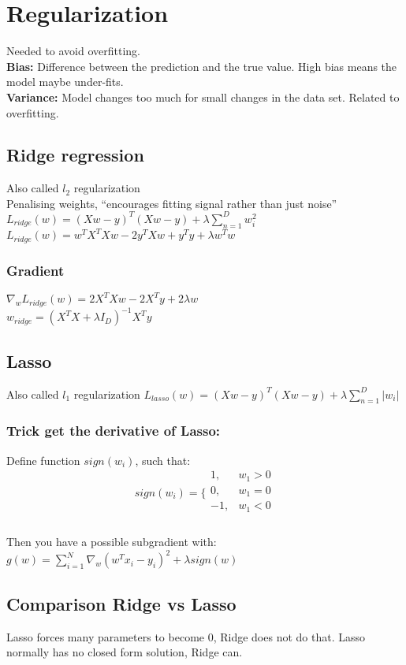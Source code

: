 \section{Regularization}
\small Needed to avoid overfitting.\\ \textbf{Bias:} Difference between the
prediction and the true value. High bias means the model maybe under-fits.\\ \textbf{Variance:}
Model changes too much for small changes in the data set. Related to overfitting.\\
\subsection{Ridge regression}
Also called $l_{2}$ regularization\\ Penalising weights, \enquote{encourages fitting signal rather than just noise}\\
$L_{ridge}(w) = (Xw - y)^{T}(Xw - y) + \lambda \sum_{n=1}^{D}w_{i}^{2}$\\ $L_{ridge}
(w) = w^{T}X^{T}Xw - 2y^{T}Xw + y^{T}y + \lambda w^{T}w$\\
\subsubsection{Gradient}
$\nabla_{w}L_{ridge}(w) = 2X^{T}Xw - 2X^{T}y + 2 \lambda w$\\ $w_{ridge}= (X^{T}X
+ \lambda I_{D})^{-1}X^{T}y$\\
\subsection{Lasso}
Also called $l_{1}$ regularization
$L_{lasso}(w) = (Xw - y)^{T}(Xw - y) + \lambda \sum_{n=1}^{D}|w_{i}|$\\
\subsubsection{Trick get the derivative of Lasso:}
\small Define function $sign(w_{i})$, such that:\\
\[
	sign(w_{i}) = \{
	\begin{array}{lr}
		1,  & w_{1} > 0 \\
		0,  & w_{1} = 0 \\
		-1, & w_{1} < 0 \\
	\end{array}
\]\\ Then you have a possible subgradient with:\\ $g(w)=\sum_{i=1}^{N}\nabla_{w}(
w^{T}x_{i}- y_{i})^{2}+ \lambda sign(w)$
\subsection{Comparison Ridge vs Lasso}
Lasso forces many parameters to become 0, Ridge does not do that. Lasso normally
has no closed form solution, Ridge can.